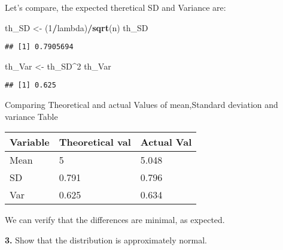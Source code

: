 \documentclass[]{article}
\newenvironment{Shaded}{\begin{snugshade}}{\end{snugshade}}
\newcommand{\KeywordTok}[1]{\textcolor[rgb]{0.13,0.29,0.53}{\textbf{#1}}}
\newcommand{\DecValTok}[1]{\textcolor[rgb]{0.00,0.00,0.81}{#1}}
\newcommand{\StringTok}[1]{\textcolor[rgb]{0.31,0.60,0.02}{#1}}
\newcommand{\OperatorTok}[1]{\textcolor[rgb]{0.81,0.36,0.00}{\textbf{#1}}}
\newcommand{\NormalTok}[1]{#1}
\begin{document}
Let's compare, the expected theretical SD and Variance are:

\begin{Shaded}
\begin{Highlighting}[]
\NormalTok{th_SD <-}\StringTok{ }\NormalTok{(}\DecValTok{1}\OperatorTok{/}\NormalTok{lambda)}\OperatorTok{/}\KeywordTok{sqrt}\NormalTok{(n)}
\NormalTok{th_SD}
\end{Highlighting}
\end{Shaded}

\begin{verbatim}
## [1] 0.7905694
\end{verbatim}

\begin{Shaded}
\begin{Highlighting}[]
\NormalTok{th_Var <-}\StringTok{ }\NormalTok{th_SD}\OperatorTok{^}\DecValTok{2}
\NormalTok{th_Var}
\end{Highlighting}
\end{Shaded}

\begin{verbatim}
## [1] 0.625
\end{verbatim}

Comparing Theoretical and actual Values of mean,Standard deviation and
variance Table

\begin{longtable}[]{@{}lll@{}}
\toprule
Variable & Theoretical val & Actual Val\tabularnewline
\midrule
\endhead
Mean & 5 & 5.048\tabularnewline
SD & 0.791 & 0.796\tabularnewline
Var & 0.625 & 0.634\tabularnewline
\bottomrule
\end{longtable}

We can verify that the differences are minimal, as expected.

\textbf{3.} Show that the distribution is approximately normal.
\end{document}
